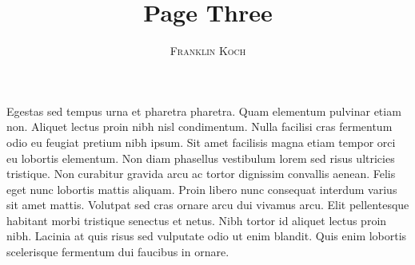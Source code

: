 \documentclass[a4paper,11pt,oneside]{book}
\title{\Huge \textbf{Page Three}}
\author{\textsc{Franklin Koch}}
\begin{document}
\sloppy

\frontmatter
\maketitle

\tableofcontents

\mainmatter

% 
% 

Egestas sed tempus urna et pharetra pharetra. Quam elementum pulvinar etiam non. Aliquet lectus proin nibh nisl condimentum. Nulla facilisi cras fermentum odio eu feugiat pretium nibh ipsum. Sit amet facilisis magna etiam tempor orci eu lobortis elementum. Non diam phasellus vestibulum lorem sed risus ultricies tristique. Non curabitur gravida arcu ac tortor dignissim convallis aenean. Felis eget nunc lobortis mattis aliquam. Proin libero nunc consequat interdum varius sit amet mattis. Volutpat sed cras ornare arcu dui vivamus arcu. Elit pellentesque habitant morbi tristique senectus et netus. Nibh tortor id aliquet lectus proin nibh. Lacinia at quis risus sed vulputate odio ut enim blandit. Quis enim lobortis scelerisque fermentum dui faucibus in ornare.
\end{document}
